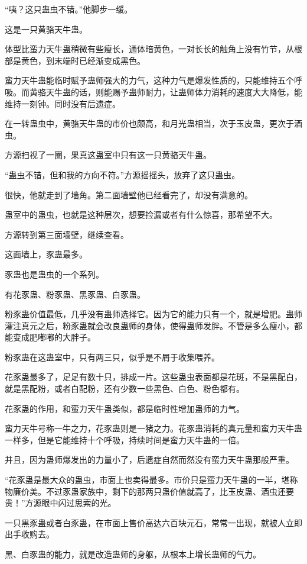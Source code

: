 \begin{this_body}
“咦？这只蛊虫不错。”他脚步一缓。

这是一只黄骆天牛蛊。

体型比蛮力天牛蛊稍微有些瘦长，通体暗黄色，一对长长的触角上没有竹节，从根部是黄色，到末端时已经渐变成黑色。

蛮力天牛蛊能临时赋予蛊师强大的力气，这种力气是爆发性质的，只能维持五个呼吸。而黄骆天牛蛊的话，则能赐予蛊师耐力，让蛊师体力消耗的速度大大降低，能维持一刻钟。同时没有后遗症。

在一转蛊虫中，黄骆天牛蛊的市价也颇高，和月光蛊相当，次于玉皮蛊，更次于酒虫。

方源扫视了一圈，果真这蛊室中只有这一只黄骆天牛蛊。

“蛊虫不错，但和我的方向不符。”方源摇摇头，放弃了这只蛊虫。

很快，他就走到了墙角。第二面墙壁他已经看完了，却没有满意的。

蛊室中的蛊虫，也就是这种层次，想要捡漏或者有什么惊喜，那希望不大。

方源转到第三面墙壁，继续查看。

这面墙上，豕蛊最多。

豕蛊也是蛊虫的一个系列。

有花豕蛊、粉豕蛊、黑豕蛊、白豕蛊。

粉豕蛊价值最低，几乎没有蛊师选择它。因为它的能力只有一个，就是增肥。蛊师灌注真元之后，粉豕蛊就会改良蛊师的身体，使得蛊师发胖。不管是多么瘦小，都能变成肥嘟嘟的大胖子。

粉豕蛊在这蛊室中，只有两三只，似乎是不屑于收集喂养。

花豕蛊最多了，足足有数十只，排成一片。这些蛊虫表面都是花斑，不是黑配白，就是黑配粉，或者白配粉，还有少数一些黑色、白色、粉色都有。

花豕蛊的作用，和蛮力天牛蛊类似，都是临时性增加蛊师的力气。

蛮力天牛号称一牛之力，花豕蛊则是一猪之力。花豕蛊消耗的真元量和蛮力天牛蛊一样多，但是它能维持十个呼吸，持续时间是蛮力天牛蛊的一倍。

并且，因为蛊师爆发出的力量小了，后遗症自然而然没有蛮力天牛蛊那般严重。

“花豕蛊是最大众的蛊虫，市面上也卖得最多。市价只是蛮力天牛蛊的一半，堪称物廉价美。不过豕蛊家族中，剩下的那两只蛊价值就高了，比玉皮蛊、酒虫还要贵！”方源眼中闪过思索的光。

一只黒豕蛊或者白豕蛊，在市面上售价高达六百块元石，常常一出现，就被人立即出手收购去。

黑、白豕蛊的能力，就是改造蛊师的身躯，从根本上增长蛊师的气力。


\end{this_body}
